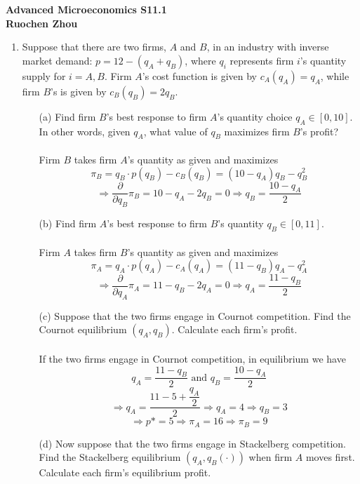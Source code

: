 \documentclass[11pt]{article}
\begin{document}
\begin{center}
\textbf{Advanced Microeconomics S11.1\\}
\textbf{Ruochen Zhou}
\end{center}

\medskip
\begin{enumerate}
\item Suppose that there are two firms, $A$ and $B$, in an industry with inverse market demand: $p=12-(q_{A}+q_{B})$, where $q_{i}$ represents firm $i$'s quantity supply for $i=A,B$. Firm $A$'s cost function is given by $c_{A}(q_{A})=q_{A}$, while firm $B$'s is given by $c_{B}(q_{B})=2q_{B}$.
	\begin{itemize}
	\item[(a)] Find firm $B$'s best response to firm $A$'s quantity choice $q_{A}\in[0,10]$. In other words, given $q_{A}$, what value of $q_{B}$ maximizes firm $B$'s profit?
	\smallskip\\\\
	Firm $B$ takes firm $A$'s quantity as given and maximizes
	$$\pi_B=q_B\cdot p(q_B)-c_B(q_B)=(10-q_A)q_B-q_B^2$$
	$$\Rightarrow\dfrac{\partial}{\partial q_B}\pi_B=10-q_A-2q_B=0\Rightarrow q_B=\dfrac{10-q_A}{2}$$
	\item[(b)] Find firm $A$'s best response to firm $B$'s quantity $q_{B}\in[0,11]$.
	\smallskip\\\\
	Firm $A$ takes firm $B$'s quantity as given and maximizes
	$$\pi_A=q_A\cdot p(q_A)-c_A(q_A)=(11-q_B)q_A-q_A^2$$
	$$\Rightarrow\dfrac{\partial}{\partial q_A}\pi_A=11-q_B-2q_A=0\Rightarrow q_A=\dfrac{11-q_B}{2}$$
	\item[(c)] Suppose that the two firms engage in Cournot competition. Find the Cournot equilibrium $(q_{A},q_{B})$. Calculate each firm's profit.
	\smallskip\\\\
	If the two firms engage in Cournot competition, in equilibrium we have\\
	$$q_A=\dfrac{11-q_B}{2}\text{ and }q_B=\dfrac{10-q_A}{2}$$
	$$\Rightarrow q_A=\dfrac{11-5+\dfrac{q_A}{2}}{2}\Rightarrow q_A=4\Rightarrow q_B=3$$
	$$\Rightarrow p*=5\Rightarrow\pi_A=16\Rightarrow\pi_B=9$$
	\item[(d)] Now suppose that the two firms engage in Stackelberg competition. Find the Stackelberg equilibrium $(q_{A},q_{B}(\cdot))$ when firm $A$ moves first. Calculate each firm's equilibrium profit.
	\smallskip\\\\

\end{itemize}
\end{enumerate}
\end{document}
